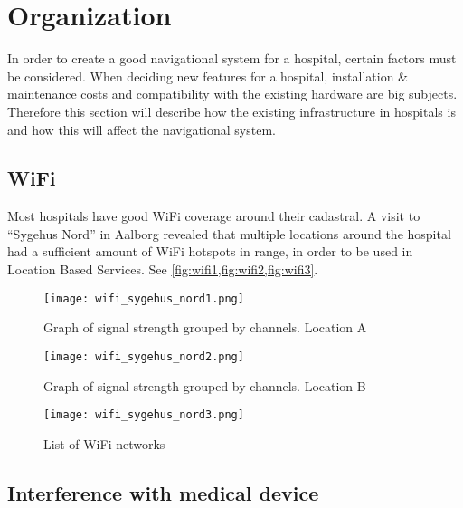 \section{Organization} %
\label{sec:organization}





In order to create a good navigational system for a hospital, certain factors must be considered. When deciding new features for a hospital, installation \& maintenance costs and compatibility with the existing hardware are big subjects. Therefore this section will describe how the existing infrastructure in hospitals is and how this will affect the navigational system.

\subsection{WiFi}

Most hospitals have good WiFi coverage around their cadastral. A visit to \enquote{Sygehus Nord} in Aalborg revealed that multiple locations around the hospital had a sufficient amount of WiFi hotspots in range, in order to be used in Location Based Services. See \cref{fig:wifi1,fig:wifi2,fig:wifi3}.

\begin{figure}
\centering
  \begin{minipage}{0.45\textwidth}
    \centering
    \texttt{[image: wifi\_sygehus\_nord1.png]}
    \caption{Graph of signal strength grouped by channels. Location A} \label{fig:wifi1}
  \end{minipage}
  \hfill
  \begin{minipage}{0.45\textwidth}
    \centering
    \texttt{[image: wifi\_sygehus\_nord2.png]}
    \caption{Graph of signal strength grouped by channels. Location B} \label{fig:wifi2}
  \end{minipage}
    \begin{minipage}{0.45\textwidth}
    \centering
    \texttt{[image: wifi\_sygehus\_nord3.png]}
    \caption{List of WiFi networks} \label{fig:wifi3}
  \end{minipage}
  \end{figure}


\subsection{Interference with medical device}

